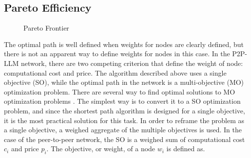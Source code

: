 \documentclass[preprint,twoside,11pt]{article}
\begin{document}
\subsection{Pareto Efficiency}
\begin{figure}[h]
	\centering
	\caption{Pareto Frontier}
	\label{fig:Pareto-optimal}
\end{figure}
The optimal path is well defined when weights for nodes are clearly defined, but there is not an apparent way to define
weights for nodes in this case. In the P2P-LLM network, there are two competing criterion that define the weight of node: computational cost and price.
The algorithm described above uses a single objective (SO), while the optimal path in the network is a multi-objective (MO) optimization problem.
There are several way to find optimal solutions to MO optimization problems \citep{1599245}. The simplest way is to convert it to a SO optimization problem, and
since the shortest path algorithm is designed for a single objective, it is the most practical solution for this task. In order to reframe the problem as a single objective,
a weighed aggregate of the multiple objectives is used. In the case of the peer-to-peer network, the SO is a weighed sum of computational cost $c_i$ and price $p_i$.
The objective, or weight, of a node $w_i$ is defined as.
\end{document}
